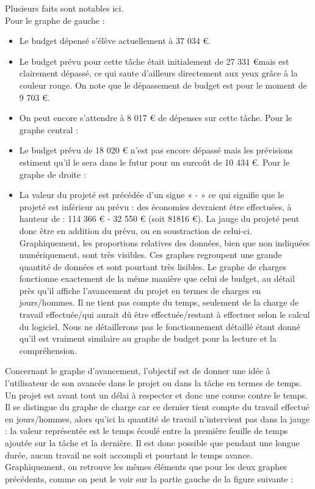 \documentclass[12pt]{report}
\begin{document}
Plusieurs faits sont notables ici.\\
Pour le graphe de gauche :\\
\begin{itemize}
\item	Le budget dépensé s’élève actuellement à 37 034 \euro{}.
\item Le budget prévu pour cette tâche était initialement de 27 331  \euro mais est clairement dépassé, ce qui saute d’ailleurs directement aux yeux grâce à la couleur rouge. On note que le dépassement de budget est pour le moment de 9 703  \euro{}.
\item On peut encore s’attendre à 8 017  \euro{} de dépenses sur cette tâche.
Pour le graphe central :
\item Le budget prévu de 18 020  \euro{} n’est pas encore dépassé mais les prévisions estiment qu’il le sera dans le futur pour un surcoût de 10 434  \euro{}.
Pour le graphe de droite : 
\item La valeur du projeté est précédée d’un signe « - » ce qui signifie que le projeté est inférieur au prévu : des économies devraient être effectuées, à hauteur de : 114 366  \euro{} - 32 550  \euro{} (soit 81816  \euro{}). La jauge du projeté peut donc être en addition du prévu, ou en soustraction de celui-ci.
Graphiquement, les proportions relatives des données, bien que non indiquées numériquement, sont très visibles. Ces graphes regroupent une grande quantité de données et sont pourtant très lisibles. Le graphe de charges fonctionne exactement de la même manière que celui de budget, au détail près qu’il affiche l’avancement du projet en termes de charges en jours/hommes. Il ne tient pas compte du temps, seulement de la charge de travail effectuée/qui aurait dû être effectuée/restant à effectuer selon le calcul du logiciel. Nous ne détaillerons pas le fonctionnement détaillé étant donné qu’il est vraiment similaire au graphe de budget pour la lecture et la compréhension.\\
\end{itemize}
Concernant le graphe d’avancement, l’objectif est de donner une idée à l’utilisateur de son avancée dans le projet ou dans la tâche en termes de temps.  Un projet est avant tout un délai à respecter et donc une course contre le temps. Il se distingue du graphe de charge car ce dernier tient compte du travail effectué en jours/hommes, alors qu’ici la quantité de travail n’intervient pas dans la jauge : la valeur représentée est le temps écoulé entre la première feuille de temps ajoutée sur la tâche et la dernière. Il est donc possible que pendant une longue durée, aucun travail ne soit accompli et pourtant le temps avance. Graphiquement, on retrouve les mêmes éléments que pour les deux graphes précédents, comme on peut le voir sur la partie gauche de la figure suivante :\\
\end{document}
